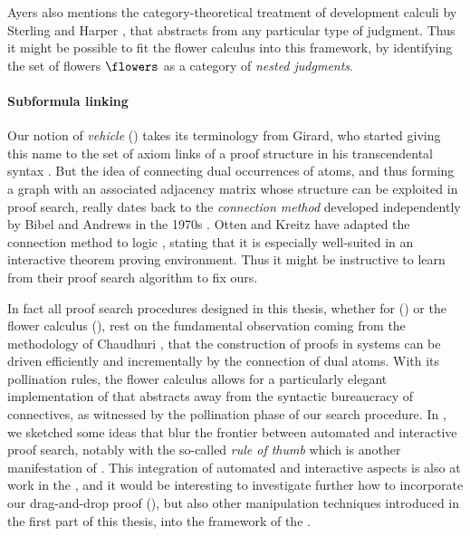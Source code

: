 \begin{scope}
Ayers also mentions the category-theoretical treatment of development calculi by
Sterling and Harper , that abstracts from any
particular type of judgment. Thus it might be possible to fit the flower
calculus into this framework, by identifying the set of flowers $\flowers$ as a
category of \emph{nested judgments}.

\paragraph{Subformula linking}

Our notion of \emph{vehicle} () takes its terminology from
Girard, who started giving this name to the set of axiom links of a proof
structure in his transcendental syntax . But the idea of connecting dual
occurrences of atoms, and thus forming a graph with an associated adjacency
matrix whose structure can be exploited in proof search, really dates back to
the \emph{connection method} developed independently by Bibel and Andrews in the
1970s . Otten and Kreitz have adapted the connection method
to  logic , stating that it is
especially well-suited in an interactive theorem proving environment. Thus it
might be instructive to learn from their proof search algorithm to fix ours.

In fact all proof search procedures designed in this thesis, whether for  () or the flower calculus
(), rest on the fundamental observation coming from the
 methodology of Chaudhuri , that the
construction of proofs in  systems can be driven efficiently and
incrementally by the connection of dual atoms. With its pollination rules, the
flower calculus allows for a particularly elegant implementation of  that abstracts away from the syntactic bureaucracy of 
connectives, as witnessed by the pollination phase of our search procedure. In
, we sketched some ideas that blur the frontier
between automated and interactive proof search, notably with the so-called
\emph{rule of thumb} which is another manifestation of . This
integration of automated and interactive aspects is also at work in the , and it would be interesting to investigate further how to incorporate
our drag-and-drop proof  (), but also other 
manipulation techniques introduced in the first part of this thesis, into the
 framework of the .


\end{scope}
